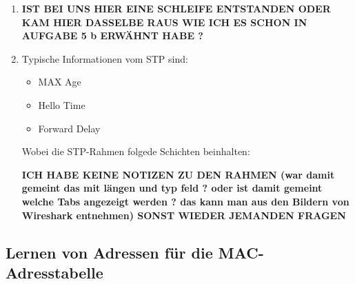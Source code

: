 \documentclass{scrartcl}
\begin{document}
\begin{enumerate}
    \item
    \textbf{IST BEI UNS HIER EINE SCHLEIFE ENTSTANDEN ODER KAM HIER DASSELBE RAUS WIE ICH ES SCHON IN AUFGABE 5 b ERWÄHNT HABE ?}
    
    \item
    Typische Informationen vom STP sind:
    
    \begin{itemize}
      \item MAX Age
      \item Hello Time
      \item Forward Delay
    \end{itemize}
     Wobei die STP-Rahmen folgede Schichten beinhalten: 
     
 	 \textbf{ICH HABE KEINE NOTIZEN ZU DEN RAHMEN (war damit gemeint das mit längen und typ feld ? oder ist damit gemeint welche Tabs angezeigt werden ? das kann man aus den Bildern von Wireshark entnehmen) SONST WIEDER JEMANDEN FRAGEN }
  \end{enumerate}

   \subsection[Aufgabe 6 Lernen von Adressen für die MAC-Adresstabelle]{Lernen von Adressen für die MAC-Adresstabelle}
   
\end{document}

